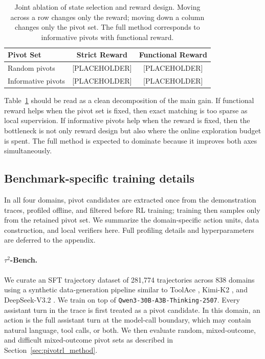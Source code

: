 \begin{table}[t]
\centering
\small
\begin{tabular}{lcc}
\toprule
\textbf{Pivot Set} & \textbf{Strict Reward} & \textbf{Functional Reward} \\
\midrule
Random pivots & [PLACEHOLDER] & [PLACEHOLDER] \\
Informative pivots & [PLACEHOLDER] & [PLACEHOLDER] \\
\bottomrule
\end{tabular}
\caption{
Joint ablation of state selection and reward design.
Moving across a row changes only the reward; moving down a column changes only the pivot set.
The full method corresponds to informative pivots with functional reward.
}
\label{tab:joint_component_ablation}
\end{table}

Table~\ref{tab:joint_component_ablation} should be read as a clean decomposition of the main gain. If functional reward helps when the pivot set is fixed, then exact matching is too sparse as local supervision. If informative pivots help when the reward is fixed, then the bottleneck is not only reward design but also where the online exploration budget is spent. The full method is expected to dominate because it improves both axes simultaneously.


\subsection{Benchmark-specific training details}
\label{sec:benchmark_specific_details}

In all four domains, pivot candidates are extracted once from the demonstration traces, profiled offline, and filtered before RL training; training then samples only from the retained pivot set. We summarize the domain-specific action units, data construction, and local verifiers here. Full profiling details and hyperparameters are deferred to the appendix.

\paragraph{$\tau^2$-Bench.}
We curate an SFT trajectory dataset of 281{,}774 trajectories across 838 domains using a synthetic data-generation pipeline similar to ToolAce \citep{liu2025toolacewinningpointsllm}, Kimi-K2 \citep{kimiteam2025kimik2openagentic}, and DeepSeek-V3.2 \citep{deepseekai2025deepseekv32pushingfrontieropen}. We train on top of \texttt{Qwen3-30B-A3B-Thinking-2507}. Every assistant turn in the trace is first treated as a pivot candidate. In this domain, an action is the full assistant turn at the model-call boundary, which may contain natural language, tool calls, or both. We then evaluate random, mixed-outcome, and difficult mixed-outcome pivot sets as described in Section~\ref{sec:pivotrl_method}.


